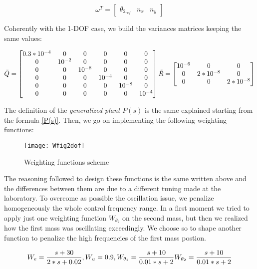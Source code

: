 \begin{equation}
	\omega^{T} =
	\begin{bmatrix}
		\theta_{2_{ref}} & n_x & n_y
	\end{bmatrix}
\end{equation}

Coherently with the 1-DOF case, we build the variances matrices keeping the same values:

\begin{equation}
	\tilde{Q}=
	\begin{bmatrix}
		0.3*10^{-4} & 0 & 0 & 0 & 0 & 0\\
		0 & 10^{-2} & 0 & 0 & 0 & 0\\
		0 & 0 & 10^{-8} & 0 & 0 & 0 \\
		0 & 0 & 0 & 10^{-4} & 0 & 0 \\
		0 & 0 & 0 & 0 & 10^{-8} & 0 \\
		0 & 0 & 0 & 0 & 0 & 10^{-4}
	\end{bmatrix}
	\\
	\tilde{R}=
	\begin{bmatrix}
		10^{-6} & 0 & 0\\
		0 & 2*10^{-8} & 0 \\
		0 & 0 & 2*10^{-8} 
	\end{bmatrix}	
\end{equation}

The definition of the \textit{generalized plant} $P(s)$ is the same explained starting from the formula \ref{P(s)}. Then, we go on implementing the following weighting functions:

\begin{figure*}[h]
	\centering
	\texttt{[image: Wfig2dof]}
	\caption{Weighting functions scheme}
	\label{Weighting functions scheme2dof}
\end{figure*}

The reasoning followed to design these functions is the same written above and the differences between them are due to a different tuning made at the laboratory. To overcome as possible the oscillation issue, we penalize homogeneously the whole control frequency range. In a first moment we tried to apply just one weighting function $W_{\theta_{2}}$ on the second mass, but then we realized how the first mass was oscillating exceedingly. We choose so to shape another function to penalize the high frequencies of the first mass postion.

\begin{equation}
	W_e=
	\frac{s+30}{2*s+0.02}
	\\
	,
	\\
	W_u=0.9
	\\
	,
	\\
	W_{\theta_{1}}=
	\frac{s+10}{0.01*s+2}
	\\
	W_{\theta_{2}}=
	\frac{s+10}{0.01*s+2}
\end{equation}

